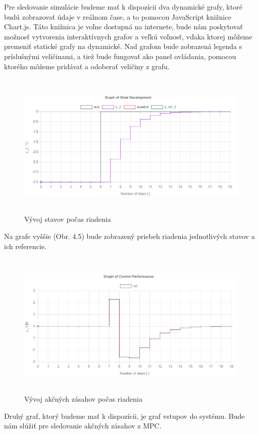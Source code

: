 Pre sledovanie simulácie budeme mať k dispozícii dva dynamické grafy, ktoré budú zobrazovať údaje v reálnom čase, a to pomocou JavaScript knižnice Chart.js. Táto knižnica je voľne dostupná na internete, bude nám poskytovať možnosť vytvorenia interaktívnych grafov a veľkú voľnosť, vďaka ktorej môžeme premeniť statické grafy na dynamické. Nad grafom bude zobrazená legenda s príslušnými veličinami, a tiež bude fungovať ako panel ovládania, pomocou ktorého môžeme pridávať a odoberať veličiny z grafu. 
\begin{figure}[H]
	\centering
	\includegraphics[width=13cm,height=7cm]{images/graf_stavov}
	\caption{Vývoj stavov počas riadenia}
\end{figure}
Na grafe vyššie (Obr. 4.5) bude zobrazený priebeh riadenia jednotlivých stavov a ich referencie.
\begin{figure}[H]	
	\centering
	\includegraphics[width=13cm,height=7cm]{images/graf_vstupov}
	\caption{Vývoj akčných zásahov počas riadenia}
\end{figure}
Druhý graf, ktorý budeme mať k dispozícii, je graf vstupov do systému. Bude nám slúžiť pre sledovanie akčných zásahov z MPC.

